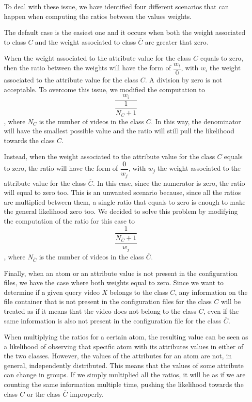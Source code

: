 To deal with these issue, we have identified four different scenarios that can happen when computing the ratios between the values weights.

The default case is the easiest one and it occurs when both the weight associated to class $C$ and the weight associated to class $\overline{C}$ are greater that zero.

When the weight associated to the attribute value for the class $\overline{C}$ equals to zero, then the ratio between the weights will have the form of $ \dfrac{w_{i}}{0} $, with $w_{i}$ the weight associated to the attribute value for the class $C$. A division by zero is not acceptable. To overcome this issue, we modified the computation to $$ \dfrac{w_{i}}{\dfrac{1}{N_{C} + 1}} $$, where $N_{C}$ is the number of videos in the class $C$. In this way, the denominator will have the smallest possible value and the ratio will still pull the likelihood towards the class $C$.

Instead, when the weight associated to the attribute value for the class $C$ equals to zero, the ratio will have the form of $ \dfrac{0}{w_{j}} $, with $w_{j}$ the weight associated to the attribute value for the class $\overline{C}$. In this case, since the numerator is zero, the ratio will equal to zero too. This is an unwanted scenario because, since all the ratios are multiplied between them, a single ratio that equals to zero is enough to make the general likelihood zero too. We decided to solve this problem by modifying the computation of the ratio for this case to $$ \dfrac{\dfrac{1}{N_{\overline{C}} + 1}}{w_{j}} $$, where $N_{\overline{C}}$ is the number of videos in the class $\overline{C}$.

Finally, when an atom or an attribute value is not present in the configuration files, we have the case where both weights equal to zero. Since we want to determine if a given query video $X$ belongs to the class $C$, any information on the file container that is not present in the configuration files for the class $C$ will be treated as if it means that the video does not belong to the class $C$, even if the same information is also not present in the configuration file for the class $\overline{C}$.

When multiplying the ratios for a certain atom, the resulting value can be seen as a likelihood of observing that specific atom with its attributes values in either of the two classes. However, the values of the attributes for an atom are not, in general, independently distributed. This means that the values of some attribute can change in groups. If we simply multiplied all the ratios, it will be as if we are counting the same information multiple time, pushing the likelihood towards the class $C$ or the class $\overline{C}$ improperly.

